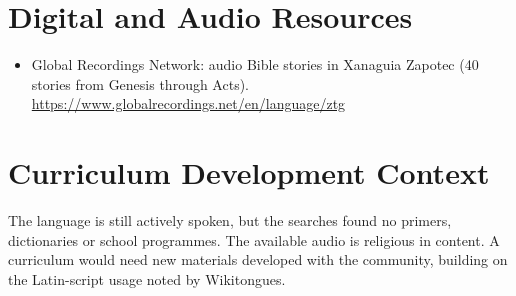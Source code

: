 \documentclass[12pt]{article}
\begin{document}
\section{Digital and Audio Resources}
\begin{itemize}
\item Global Recordings Network: audio Bible stories in Xanaguia Zapotec (40 stories from Genesis through Acts). \url{https://www.globalrecordings.net/en/language/ztg}
\end{itemize}

\section{Curriculum Development Context}
The language is still actively spoken, but the searches found no primers, dictionaries or school programmes. The available audio is religious in content. A curriculum would need new materials developed with the community, building on the Latin-script usage noted by Wikitongues.
\end{document}
